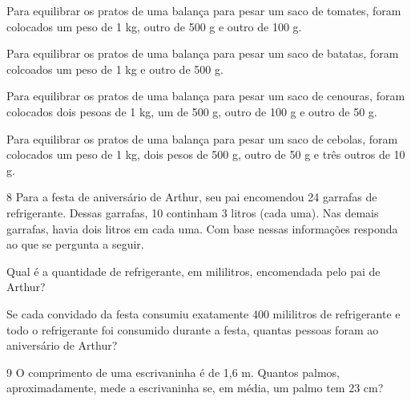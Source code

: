 \begin{escolha}
\item
  Para equilibrar os pratos de uma balança para pesar um saco de tomates, foram colocados um peso de 1 kg, outro de 500 g e outro de 100 g.


\item
  Para equilibrar os pratos de uma balança para pesar um saco de batatas, foram colcoados um peso de 1 kg e outro de 500 g.


\item
  Para equilibrar os pratos de uma balança para pesar um saco de cenouras, foram colocados dois pesoas de 1 kg, um de 500 g, outro de 100 g e outro de 50 g.


\item
  Para equilibrar os pratos de uma balança para pesar um saco de cebolas, foram colocados um peso de 1 kg, dois pesos de 500 g, outro de 50 g e três outros de 10 g.

\end{escolha}

\num{8} Para a festa de aniversário de Arthur, seu pai encomendou 24 garrafas de
refrigerante. Dessas garrafas, 10 continham 3 litros (cada uma). Nas
demais garrafas, havia dois litros em cada uma. Com base nessas
informações responda ao que se pergunta a seguir.

\begin{escolha}
\item
  Qual é a quantidade de refrigerante, em mililitros, encomendada pelo pai de Arthur?


\item
  Se cada convidado da festa consumiu exatamente 400 mililitros de refrigerante e
  todo o refrigerante foi consumido durante a festa, quantas pessoas
  foram ao aniversário de Arthur?

\end{escolha}

\num{9} O comprimento de uma escrivaninha é de 1,6 m. Quantos palmos,
aproximadamente, mede a escrivaninha se, em média, um palmo tem 23 cm?

